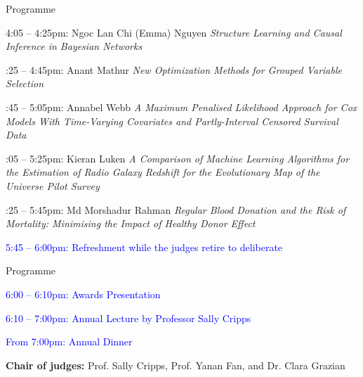 \documentclass[english]{beamer}
\begin{document}

\begin{frame}{Programme}
	\footnotesize
	
	4:05 -- 4:25pm: Ngoc Lan Chi (Emma) Nguyen \textit{Structure Learning and Causal Inference in Bayesian Networks}
	
	:25 -- 4:45pm: Anant Mathur \textit{New Optimization Methods for Grouped Variable Selection}
	
	:45 -- 5:05pm: Annabel Webb \textit{A Maximum Penalised Likelihood Approach for Cox Models With Time-Varying Covariates and Partly-Interval Censored Survival Data}
	
	:05 -- 5:25pm: Kieran Luken \textit{A Comparison of Machine Learning Algorithms for the Estimation of Radio Galaxy Redshift for the Evolutionary Map of the Universe Pilot Survey}
	
	:25 -- 5:45pm: Md Morshadur Rahman \textit{Regular Blood Donation and the Risk of Mortality: Minimising the Impact of Healthy Donor Effect}
	
	\smallskip
	\textcolor{blue}{5:45 -- 6:00pm:} \textcolor{blue}{Refreshment while the judges retire to deliberate}
\end{frame}


\begin{frame}{Programme}
	
	\textcolor{blue}{6:00 -- 6:10pm:} \textcolor{blue}{Awards Presentation}
	
	\smallskip
	\textcolor{blue}{6:10 -- 7:00pm:} \textcolor{blue}{Annual Lecture by Professor Sally Cripps}
	
	\smallskip
	\textcolor{blue}{From 7:00pm:} \textcolor{blue}{Annual Dinner}
	
	\medskip
	\textbf{Chair of judges:} Prof. Sally Cripps, Prof. Yanan Fan, and Dr. Clara Grazian
	
\end{frame}
\end{document}
